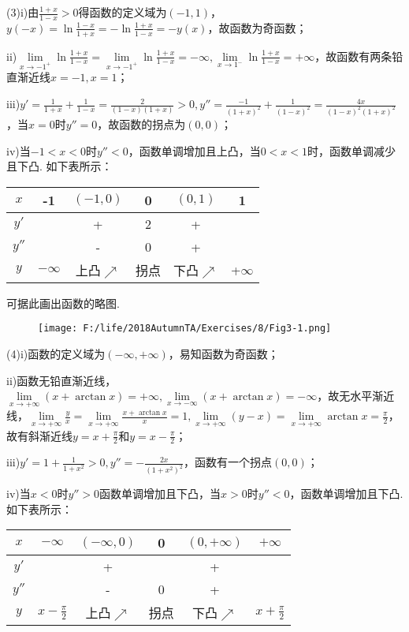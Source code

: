 \documentclass[12pt,UTF8]{ctexart}
\begin{document}
\begin{enumerate}
(3)i)由$\frac{1+x}{1-x}>0$得函数的定义域为$(-1,1)$，$y(-x)=\ln\frac{1-x}{1+x}=-\ln\frac{1+x}{1-x}=-y(x)$，故函数为奇函数；

ii)$\lim\limits_{x\rightarrow-1^+}\ln\frac{1+x}{1-x}=\lim\limits_{x\rightarrow-1^+}\ln\frac{1+x}{1-x}=-\infty,\lim\limits_{x\rightarrow1^-}\ln\frac{1+x}{1-x}=+\infty$，故函数有两条铅直渐近线$x=-1,x=1$；

iii)$y'=\frac1{1+x}+\frac1{1-x}=\frac2{(1-x)(1+x)}>0,y''=\frac{-1}{(1+x)^2}+\frac1{(1-x)^2}=\frac{4x}{(1-x)^2(1+x)^2}$，当$x=0$时$y''=0$，故函数的拐点为$(0,0)$；

iv)当$-1<x<0$时$y''<0$，函数单调增加且上凸，当$0<x<1$时，函数单调减少且下凸. 如下表所示：
\begin{table}[H]
\centering
\begin{tabular}{c|c|c|c|c|c}
\hline
$x$ & -1 & $(-1,0)$ & 0 & $(0,1)$ & 1 \\
\hline
$y'$ &  & + & 2 & + & \\
\hline
$y''$ &  & - & 0 & + & \\
\hline
$y$ & $-\infty$ & 上凸$\nearrow$ & 拐点 & 下凸$\nearrow$ & +$\infty$\\
\hline
\end{tabular}
\end{table}
可据此画出函数的略图.
\begin{figure}[H]
\begin{center}
\texttt{[image: F:/life/2018AutumnTA/Exercises/8/Fig3-1.png]}
\end{center}
\end{figure}

(4)i)函数的定义域为$(-\infty,+\infty)$，易知函数为奇函数；

ii)函数无铅直渐近线，$\lim\limits_{x\rightarrow+\infty}(x+\arctan x)=+\infty,\lim\limits_{x\rightarrow-\infty}(x+\arctan x)=-\infty$，故无水平渐近线，$\lim\limits_{x\rightarrow+\infty}\frac yx=\lim\limits_{x\rightarrow+\infty}\frac{x+\arctan x}x=1,\lim\limits_{x\rightarrow+\infty}(y-x)=\lim\limits_{x\rightarrow+\infty}\arctan x=\frac\pi2$，故有斜渐近线$y=x+\frac\pi2$和$y=x-\frac\pi2$；

iii)$y'=1+\frac1{1+x^2}>0,y''=-\frac{2x}{(1+x^2)^2}$，函数有一个拐点$(0,0)$；

iv)当$x<0$时$y''>0$函数单调增加且下凸，当$x>0$时$y''<0$，函数单调增加且下凸. 如下表所示：
\begin{table}[H]
\centering
\begin{tabular}{c|c|c|c|c|c}
\hline
$x$ & $-\infty$ & $(-\infty,0)$ & 0 & $(0,+\infty)$ & $+\infty$\\
\hline
$y'$ & & + &  & + &\\
\hline
$y''$ & & - & 0 & + &\\
\hline
$y$ & $x-\frac\pi2$ & 上凸$\nearrow$ & 拐点 & 下凸$\nearrow$ & $x+\frac\pi2$\\
\hline
\end{tabular}
\end{table}


\end{enumerate}
\end{document}
